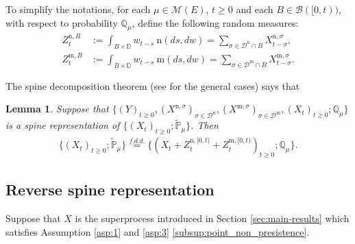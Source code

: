 \documentclass[12pt,a4paper]{amsart}
\numberwithin{equation}{section}
\theoremstyle{plain}
\newtheorem{lem}[thm]{Lemma}
\theoremstyle{definition}
\begin{document}
To simplify the notations, for each $\mu \in \mathcal M(E)$, $t\geq 0$ and each
$B \in \mathscr B([0,t))$, with respect to probability $\mathbb Q_\mu$, define
the following random measures:
\begin{align}
	Z^{\mathrm n,B}_t
	&:= \int_{B\times \mathbb D} w_{t-s} ~\mathrm n (ds,dw)
   = \sum_{\sigma \in \mathcal D^\mathrm n \cap B} X^{\mathrm n,\sigma}_{t-\sigma},
	\\ Z^{\mathrm m,B}_t
	&:= \int_{B\times \mathbb D} w_{t-s} ~\mathrm m (ds,dw)
   = \sum_{\sigma \in \mathcal D^\mathrm m \cap B} X^{\mathrm m,\sigma}_{t-\sigma}.
\end{align}

The spine decomposition theorem (see \cite{RenSongSun2019Spine} for the general
cases) says that
\begin{lem}\label{lem:spine_structure}
	Suppose that $\{(Y)_{t\geq 0}, (X^{\mathrm n, \sigma})_{\sigma\in \mathcal
    D^\mathrm n}, (X^{\mathrm m, \sigma})_{\sigma \in \mathcal D^\mathrm m},
  (X_t)_{t\geq 0}; \mathbb Q_{\mu}\}$ is a spine representation of
  $\{(X_t)_{t\geq 0}; \widetilde {\mathbb P}_\mu\}$. Then
  \begin{align}
    \{(X_t)_{t\geq 0}; \widetilde{\mathbb P}_\mu\}
    \overset{f.d.d.}{=}
    \{(X_t + Z^{\mathrm n, [0,t)}_{t} + Z^{\mathrm m, [0,t)}_{t} )_{t\geq 0}; \mathbb Q_\mu\}.
  \end{align}
\end{lem}

\subsection{Reverse spine representation}

Suppose that $X$ is the superprocess introduced in Section \ref{sec:main-results} which satisfies Assumption \ref{asp:1} and \ref{asp:3} \eqref{subsup:point_non_presistence}.
\end{document}

